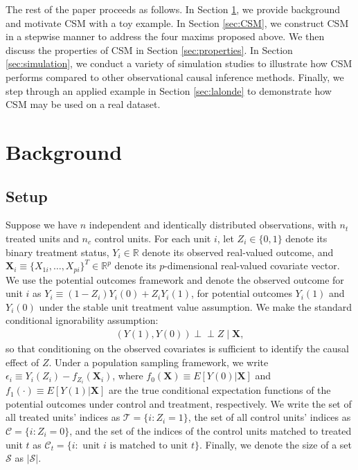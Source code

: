 \documentclass{article}
\newcommand{\bX}{\mathbf{X}}
\newcommand{\R}{\mathbb{R}}
\newcommand{\Rp}{\mathbb{R}^p}
\newcommand{\Ct}{\mathcal{C}_{t}}
\newcommand{\indep}{\perp \!\!\! \perp}
\begin{document}
The rest of the paper proceeds as follows.
In Section \ref{sec:background}, we provide background and motivate CSM with a toy example.
In Section \ref{sec:CSM}, we construct CSM in a stepwise manner to address the four maxims proposed above.
We then discuss the properties of CSM in Section \ref{sec:properties}.
In Section \ref{sec:simulation}, we conduct a variety of simulation studies to illustrate how CSM performs compared to other observational causal inference methods.
Finally, we step through an applied example in Section \ref{sec:lalonde} to demonstrate how CSM may be used on a real dataset.


\section{Background}
\label{sec:background}

\subsection{Setup}

Suppose we have $n$ independent and identically distributed observations, with $n_t$ treated units and $n_c$ control units.
For each unit $i$, let $Z_i \in \{0,1\}$ denote its binary treatment status, $Y_i \in \R$ denote its observed real-valued outcome, and $\mathbf{X}_i \equiv \{X_{1i}, \dots, X_{pi} \}^T \in \Rp$ denote its $p$-dimensional real-valued covariate vector.
We use the potential outcomes framework and denote the observed outcome for unit $i$ as $Y_i \equiv (1-Z_i) Y_i(0) + Z_i Y_i(1)$, for potential outcomes $Y_i(1)$ and $Y_i(0)$ under the stable unit treatment value assumption.
We make the standard conditional ignorability assumption:
\begin{align*}
    (Y(1), Y(0)) \indep Z \mid \bX,
\end{align*}
so that conditioning on the observed covariates is sufficient to identify the causal effect of $Z$.
Under a population sampling framework, we write $\epsilon_i \equiv Y_i(Z_i) - f_{Z_i}(\bX_i)$, where $f_0(\bX) \equiv E[Y(0) | \bX]$ and $f_1(\cdot) \equiv E[Y(1) | \bX]$ are the true conditional expectation functions of the potential outcomes under control and treatment, respectively.
We write the set of all treated units' indices as $\mathcal{T} = \{i: Z_i=1\}$, the set of all control units' indices as $\mathcal{C} = \{i: Z_i=0\}$, and the set of the indices of the control units matched to treated unit $t$ as $\Ct = \{i: \text{ unit } i \text{ is matched to unit } t\}$.
Finally, we denote the size of a set $\mathcal{S}$ as $|\mathcal{S}|$.
\end{document}
